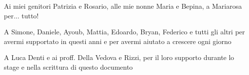 \begin{flushright}
Ai miei genitori Patrizia e Rosario, alle mie nonne Maria e Bepina, a Mariarosa per... tutto!

\medskip

A Simone, Daniele, Ayoub, Mattia, Edoardo, Bryan, Federico e tutti gli altri per avermi supportato in questi anni e per avermi aiutato a crescere ogni giorno

\medskip

A Luca Denti e ai proff. Della Vedova e Rizzi, per il loro supporto durante lo stage e nella scrittura di questo documento

\end{flushright}